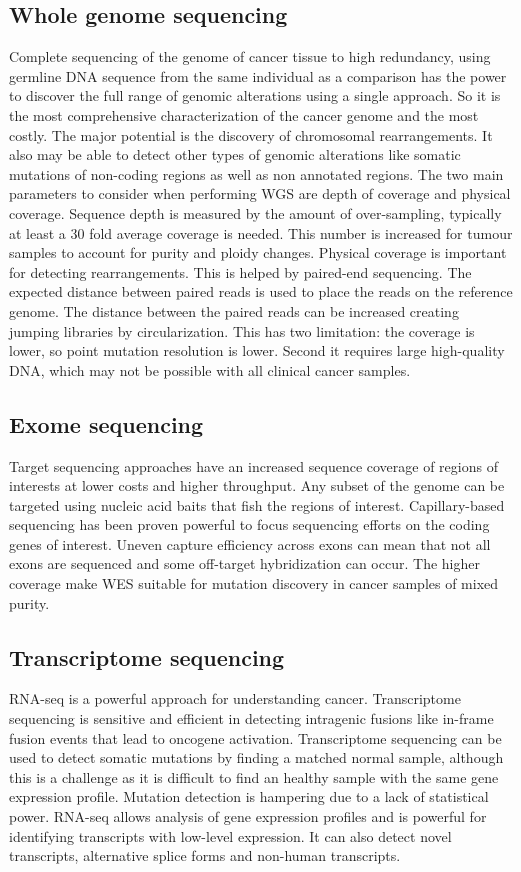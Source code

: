 	\subsection{Whole genome sequencing}
	Complete sequencing of the genome of cancer tissue to high redundancy, using germline DNA sequence from the same individual as a comparison has the power to discover the full range of genomic alterations using a single approach.
	So it is the most comprehensive characterization of the cancer genome and the most costly.
	The major potential is the discovery of chromosomal rearrangements.
	It also may be able to detect other types of genomic alterations like somatic mutations of non-coding regions as well as non annotated regions.
	The two main parameters to consider when performing WGS are depth of coverage and physical coverage.
	Sequence depth is measured by the amount of over-sampling, typically at least a $30$ fold average coverage is needed.
	This number is increased for tumour samples to account for purity and ploidy changes.
	Physical coverage is important for detecting rearrangements.
	This is helped by paired-end sequencing.
	The expected distance between paired reads is used to place the reads on the reference genome.
	The distance between the paired reads can be increased creating jumping libraries by circularization.
	This has two limitation: the coverage is lower, so	 point mutation resolution is lower.
	Second it requires large high-quality DNA, which may not be possible with all clinical cancer samples.

	\subsection{Exome sequencing}
	Target sequencing approaches have an increased sequence coverage of regions of interests at lower costs and higher throughput.
	Any subset of the genome can be targeted using nucleic acid baits that fish the regions of interest.
	Capillary-based sequencing has been proven powerful to focus sequencing efforts on the coding genes of interest.
	Uneven capture efficiency across exons can mean that not all exons are sequenced and some off-target hybridization can occur.
	The higher coverage make WES suitable for mutation discovery in cancer samples of mixed purity.

	\subsection{Transcriptome sequencing}
	RNA-seq is a powerful approach for understanding cancer.
	Transcriptome sequencing is sensitive and efficient in detecting intragenic fusions like in-frame fusion events that lead to oncogene activation.
	Transcriptome sequencing can be used to detect somatic mutations by finding a matched normal sample, although this is a challenge as it is difficult to find an healthy sample with the same gene expression profile.
	Mutation detection is hampering due to a lack of statistical power.
	RNA-seq allows analysis of gene expression profiles and is powerful for identifying transcripts with low-level expression.
	It can also detect novel transcripts, alternative splice forms and non-human transcripts.

